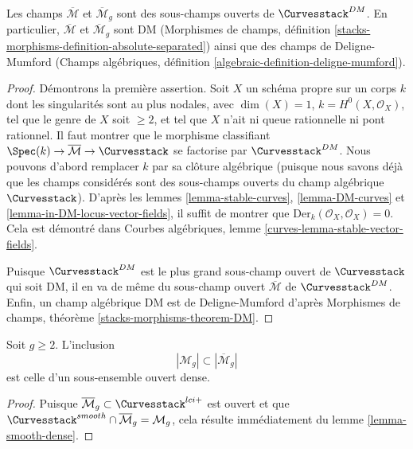 \begin{lemma}
\label{lemma-stable-curves-deligne-mumford}
Les champs $\overline{\mathcal{M}}$ et
$\overline{\mathcal{M}}_g$
sont des sous-champs ouverts de $\Curvesstack^{DM}$.
En particulier, $\overline{\mathcal{M}}$ et
$\overline{\mathcal{M}}_g$ sont DM
(Morphismes de champs, définition
\ref{stacks-morphisms-definition-absolute-separated})
ainsi que des champs de Deligne-Mumford
(Champs algébriques, définition \ref{algebraic-definition-deligne-mumford}).
\end{lemma}

\begin{proof}
Démontrons la première assertion.
Soit $X$ un schéma propre sur un corps $k$ dont les singularités
sont au plus nodales, avec $\dim(X) = 1$, $k = H^0(X, \mathcal{O}_X)$,
tel que le genre de $X$ soit $\geq 2$, et tel que $X$ n'ait
ni queue rationnelle ni pont rationnel.
Il faut montrer que le morphisme classifiant
$\Spec(k) \to \overline{\mathcal{M}} \to \Curvesstack$
se factorise par $\Curvesstack^{DM}$.
Nous pouvons d'abord remplacer $k$ par sa clôture algébrique
(puisque nous savons déjà que les champs considérés sont des sous-champs
ouverts du champ algébrique $\Curvesstack$).
D'après les lemmes \ref{lemma-stable-curves}, \ref{lemma-DM-curves} et
\ref{lemma-in-DM-locus-vector-fields}, il suffit de montrer que
$\text{Der}_k(\mathcal{O}_X, \mathcal{O}_X) = 0$.
Cela est démontré dans
Courbes algébriques, lemme \ref{curves-lemma-stable-vector-fields}.

\medskip\noindent
Puisque $\Curvesstack^{DM}$ est le plus grand sous-champ ouvert de
$\Curvesstack$ qui soit DM, il en va de même du
sous-champ ouvert $\overline{\mathcal{M}}$ de $\Curvesstack^{DM}$.
Enfin, un champ algébrique DM est de Deligne-Mumford d'après
Morphismes de champs, théorème \ref{stacks-morphisms-theorem-DM}.
\end{proof}

\begin{lemma}
\label{lemma-smooth-dense-in-stable}
Soit $g \geq 2$. L'inclusion
$$
|\mathcal{M}_g| \subset |\overline{\mathcal{M}}_g|
$$
est celle d'un sous-ensemble ouvert dense.
\end{lemma}

\begin{proof}
Puisque $\overline{\mathcal{M}}_g \subset \Curvesstack^{lci+}$
est ouvert et que
$\Curvesstack^{smooth} \cap \overline{\mathcal{M}}_g = \mathcal{M}_g$,
cela résulte immédiatement du
lemme \ref{lemma-smooth-dense}.
\end{proof}



